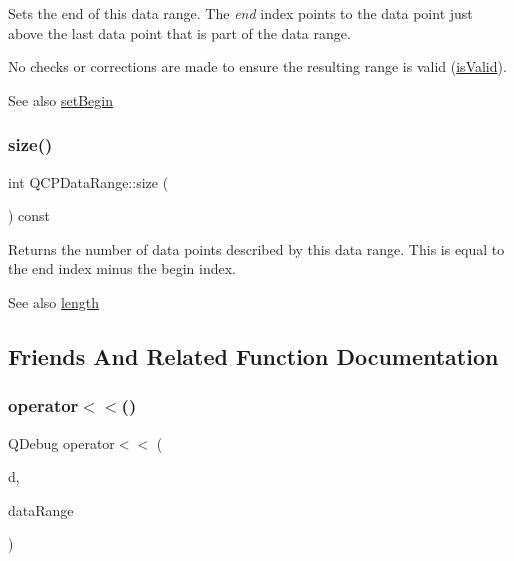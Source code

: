 Sets the end of this data range. The {\itshape end} index points to the data point just above the last data point that is part of the data range.

No checks or corrections are made to ensure the resulting range is valid (\mbox{\hyperlink{class_q_c_p_data_range_aae53a37472212dca0a7939963e20dba0}{is\+Valid}}).

\begin{DoxySeeAlso}{See also}
\mbox{\hyperlink{class_q_c_p_data_range_a54ff59048e01e46ac4aefafc844626c6}{set\+Begin}} 
\end{DoxySeeAlso}
\mbox{\label{class_q_c_p_data_range_ac6af055e509d1b691c244954ff1c5887}} 
\subsubsection{\texorpdfstring{size()}{size()}}
{\footnotesize\ttfamily int Q\+C\+P\+Data\+Range\+::size (\begin{DoxyParamCaption}{ }\end{DoxyParamCaption}) const\hspace{0.3cm}{\ttfamily [inline]}}

Returns the number of data points described by this data range. This is equal to the end index minus the begin index.

\begin{DoxySeeAlso}{See also}
\mbox{\hyperlink{class_q_c_p_data_range_a1e7836058f755c6ab9f11996477b7150}{length}} 
\end{DoxySeeAlso}


\subsection{Friends And Related Function Documentation}
\mbox{\label{class_q_c_p_data_range_a486dd7af8a090ed069672e3510e6a082}} 
\subsubsection{\texorpdfstring{operator$<$$<$()}{operator<<()}}
{\footnotesize\ttfamily Q\+Debug operator$<$$<$ (\begin{DoxyParamCaption}\item[{Q\+Debug}]{d,  }\item[{const \mbox{\hyperlink{class_q_c_p_data_range}{Q\+C\+P\+Data\+Range}} \&}]{data\+Range }\end{DoxyParamCaption})\hspace{0.3cm}{\ttfamily [related]}}

